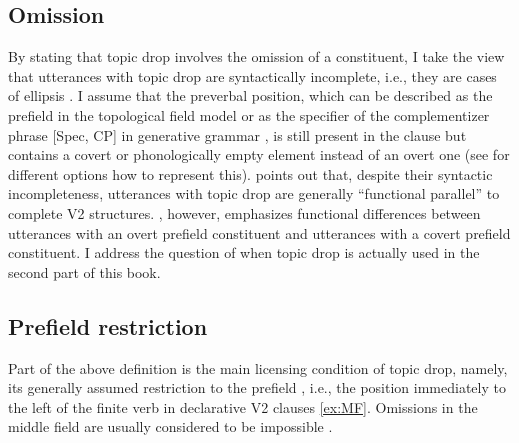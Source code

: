 \subsection{Omission}\label{sec:def.omission}
By stating that topic drop involves the omission of a constituent, I take the view that utterances with topic drop are syntactically incomplete, i.e., they are cases of ellipsis \citep[e.g.,][]{reich2011,reich2018}.
I assume that the preverbal position, which can be described as the prefield  in the topological field model  \citep{drach1937, hohle1986, wollstein2018} or as the specifier of the complementizer phrase  [Spec, CP] in generative grammar \citep{thiersch1978, denbesten1983}, is still present in the clause but contains a covert or phonologically empty element instead of an overt one (see  for different options how to represent this).
\citet[218]{reis2000} points out that, despite their syntactic incompleteness, utterances with topic drop are generally ``functional parallel'' to complete V2 structures.
\citet{helmer2016}, however, emphasizes functional differences between utterances with an overt prefield constituent and utterances with a covert prefield constituent.
I  address the question of when topic drop is actually used in the second part of this book.

\subsection{Prefield restriction}\label{sec:def.prefield}
Part of the above definition is the main licensing condition of topic drop, namely, its generally assumed restriction to the prefield \citep[e.g.,][]{fries1988,auer1993,zifonun.etal1997,reis2000,frick2017,freywald2020}, i.e., the position immediately to the left of the finite verb in declarative V2 clauses \ref{ex:MF}.
Omissions in the middle field  are usually considered to be impossible \citep[but cf.,][and see ]{helmer2016}.

